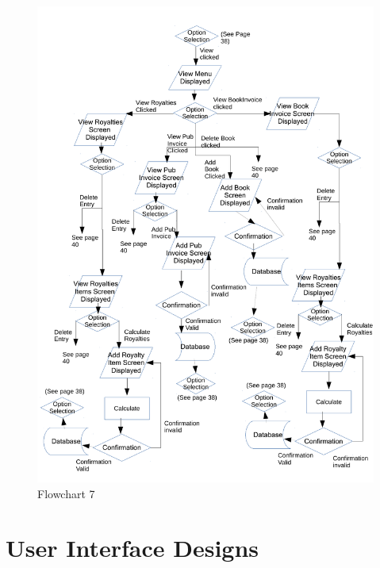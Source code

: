 \begin{figure}[H]
    \caption{Flowchart 7} \label{Flowchart_7.pdf}
    \includegraphics[width=\textwidth]{./Design/Flowcharts/Flowchart_7.pdf}
\end{figure}


\section{User Interface Designs}

